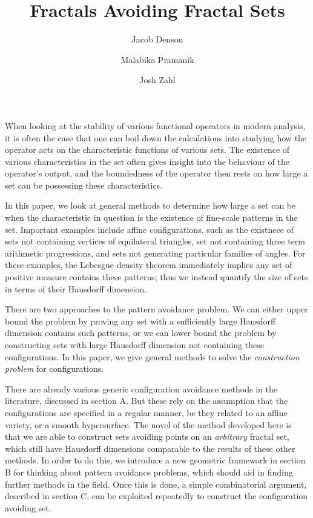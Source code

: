 \documentclass{article}
\title{Fractals Avoiding Fractal Sets}
\author{
  Jacob Denson\\
  \and
  Malabika Pramanik\\
  \and
  Josh Zahl
}
\theoremstyle{plain}
\theoremstyle{plain}
\begin{document}
\maketitle

\begin{multicols}{2}

When looking at the stability of various functional operators in modern analysis, it is often the case that one can boil down the calculations into studying how the operator acts on the characteristic functions of various sets. The existence of various characteristics in the set often gives insight into the behaviour of the operator's output, and the boundedness of the operator then rests on how large a set can be possessing these characteristics.

In this paper, we look at general methods to determine how large a set can be when the characteristic in question is the existence of fine-scale patterns in the set. Important examples include affine configurations, such as the existnece of sets not containing vertices of equilateral triangles, set not containing three term arithmetic progressions, and sets not generating particular families of angles. For these examples, the Lebesgue density theorem immediately implies any set of positive measure contains these patterns; thus we instead quantify the size of sets in terms of their Hausdorff dimension.

There are two approaches to the pattern avoidance problem. We can either upper bound the problem by proving any set with a sufficiently large Hausdorff dimension contains such patterns, or we can lower bound the problem by constructing sets with large Hausdorff dimension not containing these configurations. In this paper, we give general methods to solve the {\it construction problem} for configurations. 

There are already various generic configuration avoidance methods in the literature, discussed in section A. But these rely on the assumption that the configurations are specified in a regular manner, be they related to an affine variety, or a smooth hypersurface. The novel of the method developed here is that we are able to construct sets avoiding points on an {\it arbitrary} fractal set, which still have Hausdorff dimensions comparable to the results of these other methods. In order to do this, we introduce a new geometric framework in section B for thinking about pattern avoidance problems, which should aid in finding further methods in the field. Once this is done, a simple combinatorial argument, described in section C, can be exploited repeatedly to construct the configuration avoiding set.


\end{multicols}
\end{document}
